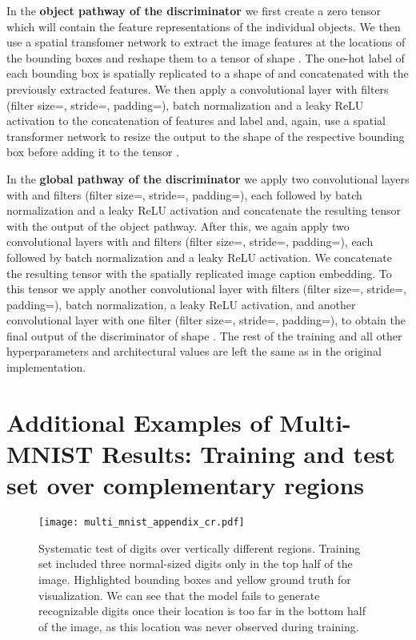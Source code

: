 \documentclass{article} \usepackage{iclr2019_conference,times}
\begin{document}
	In the \textbf{object pathway of the discriminator} we first create a zero tensor  which will contain the feature representations of the individual objects.
	We then use a spatial transfomer network to extract the image features at the locations of the bounding boxes and reshape them to a tensor of shape .
	The one-hot label of each bounding box is spatially replicated to a shape of  and concatenated with the previously extracted features.
	We then apply a convolutional layer with  filters (filter size=, stride=, padding=), batch normalization and a leaky ReLU activation to the concatenation of features and label and, again, use a spatial transformer network to resize the output to the shape of the respective bounding box before adding it to the tensor .
	
	In the \textbf{global pathway of the discriminator} we apply two convolutional layers with  and  filters (filter size=, stride=, padding=), each followed by batch normalization and a leaky ReLU activation and concatenate the resulting tensor with the output of the object pathway.
	After this, we again apply two convolutional layers with  and  filters (filter size=, stride=, padding=), each followed by batch normalization and a leaky ReLU activation.
	We concatenate the resulting tensor with the spatially replicated image caption embedding.
	To this tensor we apply another convolutional layer with  filters (filter size=, stride=, padding=), batch normalization, a leaky ReLU activation, and another convolutional layer with one filter (filter size=, stride=, padding=), to obtain the final output of the discriminator of shape .
	The rest of the training and all other hyperparameters and architectural values are left the same as in the original implementation.

\clearpage
\section{Additional Examples of Multi-MNIST Results: Training and test set over complementary regions}
\vspace{-1em}
\label{app:fig:mnist:stackgan}
	\begin{figure}[h]
		\centering
		\texttt{[image: multi\_mnist\_appendix\_cr.pdf]}
		\caption{Systematic test of digits over vertically different regions. Training set included three normal-sized digits only in the top half of the image. Highlighted bounding boxes and yellow ground truth for visualization. We can see that the model fails to generate recognizable digits once their location is too far in the bottom half of the image, as this location was never observed during training.}
		\label{fig:mnist:appendix}
	\end{figure}
\end{document}
